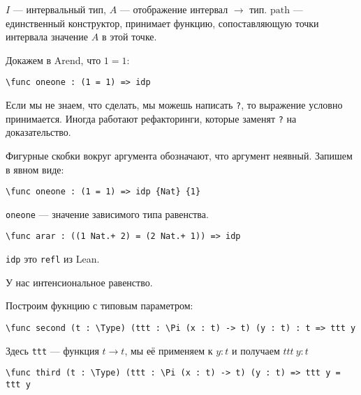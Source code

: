 \(I\) --- интервальный тип, \(A\) --- отображение интервал \( \to \) тип. \(\mathrm{path}\) --- единственный конструктор, принимает функцию, сопоставляющую точки интервала значение \(A\) в этой точке.

Докажем в Arend, что \(1 = 1\):
\begin{verbatim}
\func oneone : (1 = 1) => idp
\end{verbatim}

Если мы не знаем, что сделать, мы можешь написать \texttt{?}, то выражение условно принимается. Иногда работают рефакторинги, которые заменят \texttt{?} на доказательство.

Фигурные скобки вокруг аргумента обозначают, что аргумент неявный. Запишем в явном виде:

\begin{verbatim}
\func oneone : (1 = 1) => idp {Nat} {1}
\end{verbatim}

\texttt{oneone} --- значение зависимого типа равенства.

\begin{verbatim}
\func arar : ((1 Nat.+ 2) = (2 Nat.+ 1)) => idp
\end{verbatim}

\texttt{idp} это \texttt{refl} из Lean.

У нас интенсиональное равенство.

Построим фукнцию с типовым параметром:
\begin{verbatim}
\func second (t : \Type) (ttt : \Pi (x : t) -> t) (y : t) : t => ttt y
\end{verbatim}
Здесь \texttt{ttt} --- функция \(t \to t\), мы её применяем к \(y : t\) и получаем \(ttt\ y : t\)

\begin{verbatim}
\func third (t : \Type) (ttt : \Pi (x : t) -> t) (y : t) => ttt y = ttt y
\end{verbatim}
